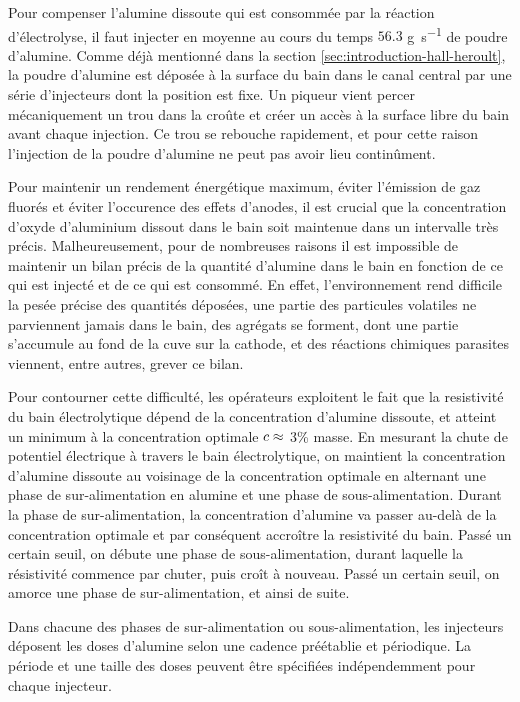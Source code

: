Pour compenser l'alumine dissoute qui est consommée par la réaction
d'électrolyse, il faut injecter en moyenne au cours du temps $56.3$
\si{\gram\per\second} de poudre d'alumine. Comme déjà mentionné dans
la section \ref{sec:introduction-hall-heroult}, la poudre d'alumine
est déposée à la surface du bain dans le canal central par une série
d'injecteurs dont la position est fixe. Un piqueur vient percer
mécaniquement un trou dans la croûte et créer un accès à la surface
libre du bain avant chaque injection. Ce trou se rebouche rapidement,
et pour cette raison l'injection de la poudre d'alumine ne peut pas
avoir lieu continûment.

Pour maintenir un rendement énergétique maximum, éviter l'émission de
gaz fluorés et éviter l'occurence des effets d'anodes, il est crucial
que la concentration d'oxyde d'aluminium dissout dans le bain soit
maintenue dans un intervalle très précis. Malheureusement, pour de
nombreuses raisons il est impossible de maintenir un bilan précis de
la quantité d'alumine dans le bain en fonction de ce qui est injecté
et de ce qui est consommé. En effet, l'environnement rend difficile la
pesée précise des quantités déposées, une partie des particules
volatiles ne parviennent jamais dans le bain, des agrégats se forment,
dont une partie s'accumule au fond de la cuve sur la cathode, et des
réactions chimiques parasites viennent, entre autres, grever ce bilan.

Pour contourner cette difficulté, les opérateurs exploitent le fait
que la resistivité du bain électrolytique dépend de la concentration
d'alumine dissoute, et atteint un minimum à la concentration optimale
$c \approx$ \num{3}\% masse. En mesurant la chute de
potentiel électrique à travers le bain électrolytique, on maintient la
concentration d'alumine dissoute au voisinage de la concentration
optimale en alternant une phase de sur-alimentation en alumine et une
phase de sous-alimentation. Durant la phase de sur-alimentation, la
concentration d'alumine va passer au-delà de la concentration optimale
et par conséquent accroître la resistivité du bain. Passé un certain
seuil, on débute une phase de sous-alimentation, durant laquelle la
résistivité commence par chuter, puis croît à nouveau. Passé un
certain seuil, on amorce une phase de sur-alimentation, et ainsi de
suite.

Dans chacune des phases de sur-alimentation ou sous-alimentation, les
injecteurs déposent les doses d'alumine selon une cadence préétablie
et périodique. La période et une taille des doses peuvent être spécifiées
indépendemment pour chaque injecteur.


